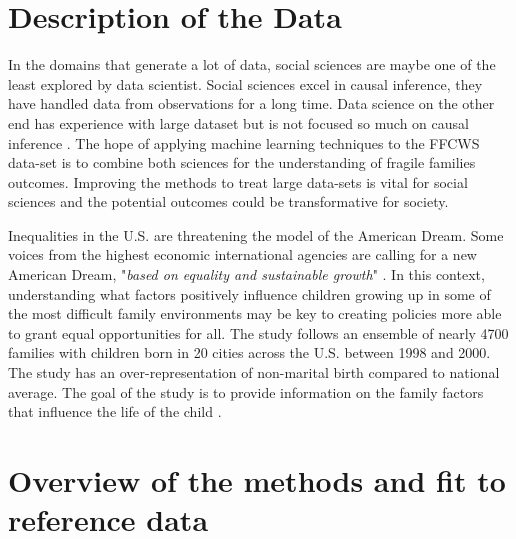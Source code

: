 \documentclass{article} %
\begin{document}
\section{Description of the Data}
In the domains that generate a lot of data, social sciences are maybe one of the least explored by data scientist. Social sciences excel in causal inference, they have handled data from observations for a long time. Data science on the other end has experience with large dataset but is not focused so much on causal inference \cite{grimmer2015we}. The hope of applying machine learning techniques to the FFCWS data-set is to combine both sciences for the understanding of fragile families outcomes. Improving the methods to treat large data-sets is vital for social sciences and the potential outcomes could be transformative for society.

Inequalities in the U.S. are threatening the model of the American Dream. Some voices from the highest economic international agencies are calling for a new American Dream, "\textit{based on equality and sustainable growth}" \cite{wef2017}. In this context, understanding what factors positively influence children growing up in some of the most difficult family environments may be key to creating policies more able to grant equal opportunities for all. The study follows an ensemble of nearly 4700 families with children born in 20 cities across the U.S. between 1998 and 2000. The study has an over-representation of non-marital birth compared to national average. The goal of the study is to provide information on the family factors that influence the life of the child  \cite{reichman2001fragile}.


\section{Overview of the methods and fit to reference data}
\end{document}
